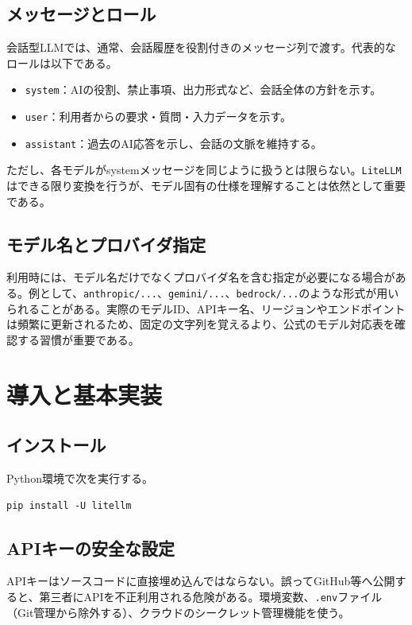 \documentclass[11pt,a4paper]{bxjsarticle}
\newcommand{\litellm}{\texttt{LiteLLM}}
\begin{document}
\subsection{メッセージとロール}
会話型LLMでは、通常、会話履歴を役割付きのメッセージ列で渡す。代表的なロールは以下である。
\begin{itemize}
  \item \texttt{system}：AIの役割、禁止事項、出力形式など、会話全体の方針を示す。
  \item \texttt{user}：利用者からの要求・質問・入力データを示す。
  \item \texttt{assistant}：過去のAI応答を示し、会話の文脈を維持する。
\end{itemize}
ただし、各モデルがsystemメッセージを同じように扱うとは限らない。\litellm{}はできる限り変換を行うが、モデル固有の仕様を理解することは依然として重要である。

\subsection{モデル名とプロバイダ指定}
利用時には、モデル名だけでなくプロバイダ名を含む指定が必要になる場合がある。例として、\texttt{anthropic/...}、\texttt{gemini/...}、\texttt{bedrock/...}のような形式が用いられることがある。実際のモデルID、APIキー名、リージョンやエンドポイントは頻繁に更新されるため、固定の文字列を覚えるより、公式のモデル対応表を確認する習慣が重要である。

\section{導入と基本実装}
\subsection{インストール}
Python環境で次を実行する。

\begin{lstlisting}[style=python,caption={インストールコマンド}]
pip install -U litellm
\end{lstlisting}

\subsection{APIキーの安全な設定}
APIキーはソースコードに直接埋め込んではならない。誤ってGitHub等へ公開すると、第三者にAPIを不正利用される危険がある。環境変数、\texttt{.env}ファイル（Git管理から除外する）、クラウドのシークレット管理機能を使う。
\end{document}
